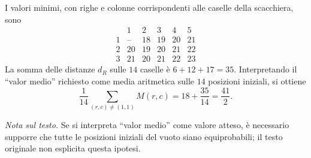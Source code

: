 {I valori minimi, con righe e colonne corrispondenti alle caselle
della scacchiera, sono
\[
\begin{array}{c|ccccc}
 &1&2&3&4&5\\ \hline
1&\text{--}&18&19&20&21\\
2&20&19&20&21&22\\
3&21&20&21&22&23
\end{array}
\]
La somma delle distanze $d_R$ sulle $14$ caselle \`e
$6+12+17=35$. Interpretando il ``valor medio'' richiesto
come media aritmetica sulle $14$ posizioni iniziali,
si ottiene
\[
\frac1{14}\sum_{(r,c)\ne(1,1)} M(r,c)
=18+\frac{35}{14}=\boxed{\frac{41}{2}}.
\]

\textit{Nota sul testo.} Se si interpreta ``valor medio'' come
valore atteso, \`e necessario supporre che tutte le posizioni
iniziali del vuoto siano equiprobabili; il testo originale
non esplicita questa ipotesi.
}
\renewcommand{\SoluzioniAlternative}{}
\renewcommand{\Osservazioni}{}
\renewcommand{\Commenti}{}
